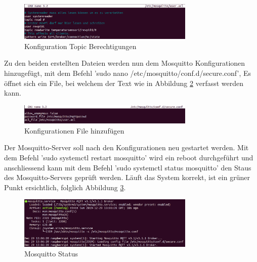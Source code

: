 \begin{figure}[H]
	\centering
	\includegraphics[width=0.75\textwidth]{graphics/useracl.png}
	\caption{Konfiguration Topic Berechtigungen}
	\label{pic: useracl}
\end{figure}

Zu den beiden erstellten Dateien werden nun dem Mosquitto Konfigurationen hinzugefügt, mit dem Befehl 'sudo nano /etc/mosquitto/conf.d/secure.conf', Es öffnet sich ein File, bei welchem der Text wie in Abbildung \ref{pic: secureconf} verfasst werden kann.

\begin{figure}[H]
	\centering
	\includegraphics[width=0.75\textwidth]{graphics/MosquittoSecureConf.png}
	\caption{Konfigurationen File hinzufügen}
	\label{pic: secureconf}
\end{figure}

Der Mosquitto-Server soll nach den Konfigurationen neu gestartet werden. Mit dem Befehl 'sudo systemctl restart mosquitto' wird ein reboot durchgeführt und anschliessend kann mit dem Befehl 'sudo systemctl status mosquitto' den Staus des Mosquitto-Servers geprüft werden. Läuft das System korrekt, ist ein grüner Punkt ersichtlich, folglich Abbildung \ref{pic: mosquittoStatus}.

\begin{figure}[H]
	\centering
	\includegraphics[width=0.75\textwidth]{graphics/MosquittoStatus.png}
	\caption{Mosquitto Status}
	\label{pic: mosquittoStatus}
\end{figure}


